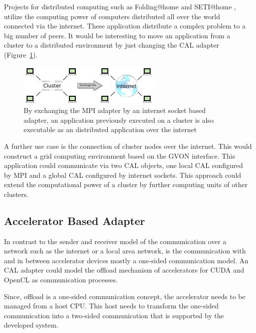 Projects for distributed computing such as Folding@home
\cite{ref:folding_at_home} and SETI@home \cite{ref:seti_at_home},
utilize the computing power of computers distributed all over the
world connected via the internet.  These application distribute a
complex problem to a big number of peers. It would be interesting
to move an application from a cluster to a distributed environment
by just changing the CAL adapter (Figure~\ref{fig:internet_cal}).

\begin{figure}[H]
  \centering \includegraphics[width=\textwidth]{graphics/60_internet_cal}
  \caption{By exchanging the MPI adapter by an internet socket based
    adapter, an application previously executed on a cluster is also
    executable as an distributed application over the internet}
  \label{fig:internet_cal}
\end{figure}

\noindent A further use case is the connection of cluster nodes over
the internet. This would construct a grid computing environment based
on the GVON interface. This application could communicate via two CAL
objects, one local CAL configured by MPI and a global CAL
configured by internet sockets.  This approach could extend the
computational power of a cluster by further computing units of other
clusters.

\subsection*{Accelerator Based Adapter}

In contrast to the sender and receiver model of the communication over
a network such as the internet or a local area network, is the
communication with and in between accelerator devices mostly a
one-sided communication model.  An CAL adapter could model the offload
mechanism of accelerators for CUDA and OpenCL as communication
processes.

Since, offload is a one-sided communication concept, the
accelerator needs to be managed from a host CPU. This host
needs to transform the one-sided communication into a two-sided
communication that is supported by the developed system.

